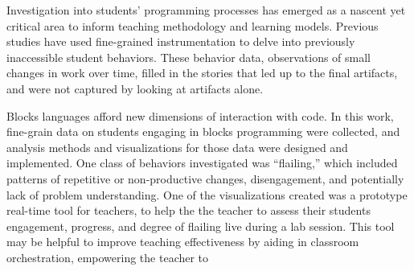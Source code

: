 % 
% 
%

Investigation into students' programming processes has emerged as a nascent yet critical area to inform teaching methodology and learning models. Previous studies have used fine-grained instrumentation to delve into previously inaccessible student behaviors. These behavior data, observations of small changes in work over time, filled in the stories that led up to the final artifacts, and were not captured by looking at artifacts alone. 

Blocks languages afford new dimensions of interaction with code. In this work, fine-grain data on students engaging in blocks programming were collected, and analysis methods and visualizations for those data were designed and implemented. One class of behaviors investigated was ``flailing,'' which included patterns of repetitive or non-productive changes, disengagement, and potentially lack of problem understanding. One of the visualizations created was a prototype real-time tool for teachers, to help the the teacher to assess their students engagement, progress, and degree of flailing live during a lab session. This tool may be helpful to improve teaching effectiveness by aiding in classroom orchestration, empowering the teacher to 
